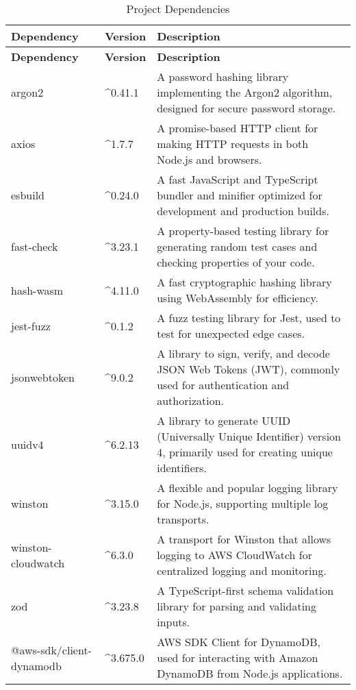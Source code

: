 \begin{longtable}{|l|l|p{8cm}|}
    \caption{Project Dependencies}
    \label{table:dev_dependencies}
\hline
\rowcolor{grey!15}
\textbf{Dependency} & \textbf{Version} & \textbf{Description} \\ \hline
\endfirsthead
\hline
\rowcolor{grey!15}
\textbf{Dependency} & \textbf{Version} & \textbf{Description} \\ \hline
\endhead
\endfoot
\hline
\endlastfoot
argon2 & \textasciicircum 0.41.1 & A password hashing library implementing the Argon2 algorithm, designed for secure password storage. \\ \hline
axios & \textasciicircum 1.7.7 & A promise-based HTTP client for making HTTP requests in both Node.js and browsers. \\ \hline
esbuild & \textasciicircum 0.24.0 & A fast JavaScript and TypeScript bundler and minifier optimized for development and production builds. \\ \hline
fast-check & \textasciicircum 3.23.1 & A property-based testing library for generating random test cases and checking properties of your code. \\ \hline
hash-wasm & \textasciicircum 4.11.0 & A fast cryptographic hashing library using WebAssembly for efficiency. \\ \hline
jest-fuzz & \textasciicircum 0.1.2 & A fuzz testing library for Jest, used to test for unexpected edge cases. \\ \hline
jsonwebtoken & \textasciicircum 9.0.2 & A library to sign, verify, and decode JSON Web Tokens (JWT), commonly used for authentication and authorization. \\ \hline
uuidv4 & \textasciicircum 6.2.13 & A library to generate UUID (Universally Unique Identifier) version 4, primarily used for creating unique identifiers. \\ \hline
winston & \textasciicircum 3.15.0 & A flexible and popular logging library for Node.js, supporting multiple log transports. \\ \hline
winston-cloudwatch & \textasciicircum 6.3.0 & A transport for Winston that allows logging to AWS CloudWatch for centralized logging and monitoring. \\ \hline
zod & \textasciicircum 3.23.8 & A TypeScript-first schema validation library for parsing and validating inputs. \\ \hline
@aws-sdk/client-dynamodb & \textasciicircum 3.675.0 & AWS SDK Client for DynamoDB, used for interacting with Amazon DynamoDB from Node.js applications. \\ \hline

\end{longtable}
